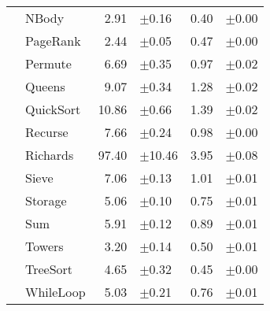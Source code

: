 \begin{tabular}{ll@{\hspace{6pt}}r@{\hspace{3pt}}l@{\hspace{6pt}}r@{\hspace{3pt}}l}
 & NBody & 2.91 & \scriptsize\textcolor{gray!60}{$\pm$0.16} & 0.40 & \scriptsize\textcolor{gray!60}{$\pm$0.00} \\
 & PageRank & 2.44 & \scriptsize\textcolor{gray!60}{$\pm$0.05} & 0.47 & \scriptsize\textcolor{gray!60}{$\pm$0.00} \\
 & Permute & 6.69 & \scriptsize\textcolor{gray!60}{$\pm$0.35} & 0.97 & \scriptsize\textcolor{gray!60}{$\pm$0.02} \\
 & Queens & 9.07 & \scriptsize\textcolor{gray!60}{$\pm$0.34} & 1.28 & \scriptsize\textcolor{gray!60}{$\pm$0.02} \\
 & QuickSort & 10.86 & \scriptsize\textcolor{gray!60}{$\pm$0.66} & 1.39 & \scriptsize\textcolor{gray!60}{$\pm$0.02} \\
 & Recurse & 7.66 & \scriptsize\textcolor{gray!60}{$\pm$0.24} & 0.98 & \scriptsize\textcolor{gray!60}{$\pm$0.00} \\
 & Richards & 97.40 & \scriptsize\textcolor{gray!60}{$\pm$10.46} & 3.95 & \scriptsize\textcolor{gray!60}{$\pm$0.08} \\
 & Sieve & 7.06 & \scriptsize\textcolor{gray!60}{$\pm$0.13} & 1.01 & \scriptsize\textcolor{gray!60}{$\pm$0.01} \\
 & Storage & 5.06 & \scriptsize\textcolor{gray!60}{$\pm$0.10} & 0.75 & \scriptsize\textcolor{gray!60}{$\pm$0.01} \\
 & Sum & 5.91 & \scriptsize\textcolor{gray!60}{$\pm$0.12} & 0.89 & \scriptsize\textcolor{gray!60}{$\pm$0.01} \\
 & Towers & 3.20 & \scriptsize\textcolor{gray!60}{$\pm$0.14} & 0.50 & \scriptsize\textcolor{gray!60}{$\pm$0.01} \\
 & TreeSort & 4.65 & \scriptsize\textcolor{gray!60}{$\pm$0.32} & 0.45 & \scriptsize\textcolor{gray!60}{$\pm$0.00} \\
 & WhileLoop & 5.03 & \scriptsize\textcolor{gray!60}{$\pm$0.21} & 0.76 & \scriptsize\textcolor{gray!60}{$\pm$0.01} \\
\bottomrule
\end{tabular}